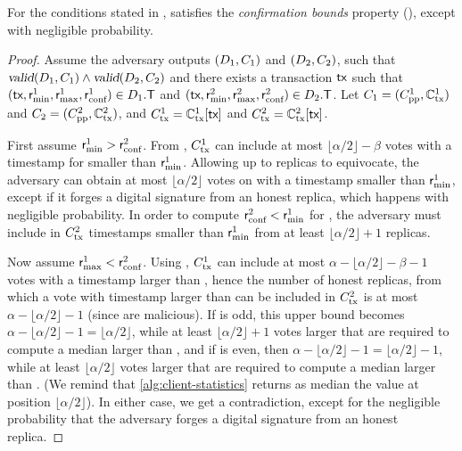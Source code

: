 \begin{lemma}\label{lem:bounds-safety}
	For the conditions stated in ,  satisfies the \emph{confirmation bounds}  property (), except with negligible probability.
\end{lemma}
\begin{proof}
	Assume the adversary outputs $(D_1, C_1)$ and $(D_2, C_2)$, such that $\textsl{valid}(D_1, C_1) \land \textsl{valid}(D_2, C_2)$ and there exists a transaction $\textsf{tx}$ such that $(\textsf{tx}, \textsf{r}_\text{min}^1, \textsf{r}_\text{max}^1, \textsf{r}_\text{conf}^1) \in D_1.\textsf{T}$ and $(\textsf{tx}, \textsf{r}_\text{min}^2, \textsf{r}_\text{max}^2, \textsf{r}_\text{conf}^2) \in D_2.\textsf{T}$.
	Let $C_1 = (C_\text{pp}^1, \mathbb{C}_\text{tx}^1)$ and $C_2 = (C_\text{pp}^2, \mathbb{C}_\text{tx}^2)$, and $C_\text{tx}^1 = \mathbb{C}_\text{tx}^1[\textsf{tx}]$ and $C_\text{tx}^2 = \mathbb{C}_\text{tx}^2[\textsf{tx}]$.

	First assume $\textsf{r}_\text{min}^1 > \textsf{r}_\text{conf}^2$.
	From , $C_\text{tx}^1$ can include at most $\lfloor \alpha / 2 \rfloor - \beta$ votes with a timestamp for \tx smaller than $\textsf{r}_\text{min}^1$.
	Allowing up to \beta replicas to equivocate, the adversary can obtain at most $\lfloor \alpha / 2 \rfloor$ votes on \tx with a timestamp smaller than $\textsf{r}_\text{min}^1$, except if it forges a digital signature from an honest replica, which happens with negligible probability.
	In order to compute $\textsf{r}_\text{conf}^2 < \textsf{r}_\text{min}^1$ for \tx, the adversary must include in $C_\text{tx}^2$ timestamps smaller than $\textsf{r}_\text{min}^1$ from at least $\lfloor \alpha / 2 \rfloor + 1$ replicas.

	Now assume $\textsf{r}_\text{max}^1 < \textsf{r}_\text{conf}^2$.
	Using , $C_\text{tx}^1$ can include at most $\alpha - \lfloor \alpha / 2 \rfloor - \beta - 1$ votes with a timestamp larger than \rmax,
	hence the number of honest replicas, from which a vote with timestamp larger than \rmax can be included in $C_\text{tx}^2$ is at most $\alpha - \lfloor \alpha / 2 \rfloor - 1$ (since \beta are malicious).
	If \alpha is odd, this upper bound becomes $\alpha - \lfloor \alpha / 2 \rfloor -1 = \lfloor \alpha / 2 \rfloor $, while at least
	$\lfloor \alpha / 2 \rfloor + 1$ votes larger that \rmax are required to compute a median larger than \rmax,
	and if \alpha is even, then $\alpha - \lfloor \alpha / 2 \rfloor - 1 = \lfloor \alpha / 2 \rfloor - 1$, while at least
	$\lfloor \alpha / 2 \rfloor$ votes larger that \rmax are required to compute a median larger than \rmax.
	(We remind that \cref{alg:client-statistics} returns as median the value at position $\lfloor \alpha /  2 \rfloor$).
	In either case, we get a contradiction, except for the negligible probability that the adversary forges a digital signature from an honest replica.
\end{proof}


